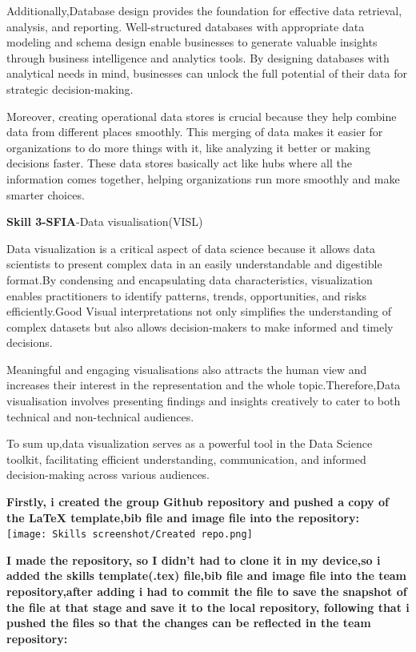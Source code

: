 \documentclass[a4paper, 11pt]{report}
\begin{document}
{Additionally,Database design provides the foundation for effective data retrieval, analysis, and reporting. Well-structured databases with appropriate data modeling and schema design enable businesses to generate valuable insights through business intelligence and analytics tools. By designing databases with analytical needs in mind, businesses can unlock the full potential of their data for strategic decision-making\cite{miro}.

Moreover, creating operational data stores is crucial because they help combine data from different places smoothly. This merging of data makes it easier for organizations to do more things with it, like analyzing it better or making decisions faster. These data stores basically act like hubs where all the information comes together, helping organizations run more smoothly and make smarter choices.

\textbf{Skill 3-SFIA}-Data visualisation(VISL)\cite{sfiads}

Data visualization is a critical aspect of data science because it allows data scientists to present complex data in an easily understandable and digestible format\cite{gfg}.By condensing and encapsulating data characteristics, visualization enables practitioners to identify patterns, trends, opportunities, and risks efficiently.Good Visual interpretations not only simplifies the understanding of complex datasets but also allows decision-makers to make informed and timely decisions. 

Meaningful and engaging visualisations also attracts the human view and increases their interest in the representation and the whole topic.Therefore,Data visualisation involves presenting findings and insights creatively to cater to both technical and non-technical audiences\cite{sfia3}.

To sum up,data visualization serves as a powerful tool in the Data Science toolkit, facilitating efficient understanding, communication, and informed decision-making across various audiences.
\newpage



\textbf{Firstly, i created the group Github repository and pushed a copy of the LaTeX template,bib file and image file into the repository:}\\

\texttt{[image: Skills screenshot/Created repo.png]}
\label{fig: create repo}

\textbf{I made the repository, so I didn't had to clone it in my device,so i added the skills template(.tex) file,bib file and image file into the team repository,after adding i had to commit the file to save the snapshot of the file at that stage and save it to the local repository, following that i pushed the files so that the changes can be reflected in the team repository:}\\

}
\end{document}
